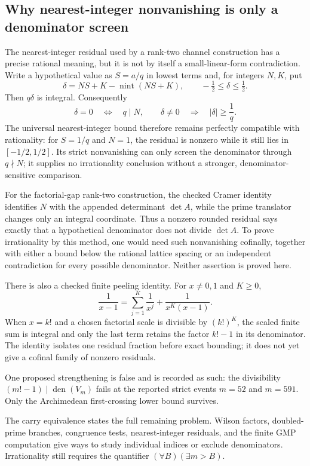 \documentclass[11pt]{article}
\newcommand{\Ser}{S}
\begin{document}
\subsection{Why nearest-integer nonvanishing is only a denominator screen}

The nearest-integer residual used by a rank-two channel construction has a
precise rational meaning, but it is not by itself a small-linear-form
contradiction.  Write a hypothetical value as $\Ser=a/q$ in lowest terms and,
for integers $N,K$, put
\[
  \delta= N\Ser+K-\operatorname{nint}(N\Ser+K),
  \qquad -\tfrac12\leq\delta\leq\tfrac12 .
\]
Then $q\delta$ is integral.  Consequently
\[
  \delta=0\quad\Longleftrightarrow\quad q\mid N,
  \qquad
  \delta\ne0\quad\Longrightarrow\quad |\delta|\geq\frac1q.
\]
The universal nearest-integer bound therefore remains perfectly compatible
with rationality: for $\Ser=1/q$ and $N=1$, the residual is nonzero while it
still lies in $[-1/2,1/2]$.  Its strict nonvanishing can only screen the
denominator through $q\nmid N$; it supplies no irrationality conclusion
without a stronger, denominator-sensitive comparison.

For the factorial-gap rank-two construction, the checked Cramer identity
identifies $N$ with the appended determinant $\det A$, while the prime
translator changes only an integral coordinate.  Thus a nonzero rounded
residual says exactly that a hypothetical denominator does not divide
$\det A$.  To prove irrationality by this method, one would need such
nonvanishing cofinally, together with either a bound below the rational lattice
spacing or an independent contradiction for every possible denominator.
Neither assertion is proved here.

There is also a checked finite peeling identity.  For $x\ne0,1$ and $K\ge0$,
\[
  \frac1{x-1}
  =\sum_{j=1}^{K}\frac1{x^j}
   +\frac1{x^K(x-1)}.
\]
When $x=k!$ and a chosen factorial scale is divisible by $(k!)^K$, the scaled
finite sum is integral and only the last term retains the factor $k!-1$ in
its denominator.  The identity isolates one residual fraction before exact
bounding; it does not yet give a cofinal family of nonzero residuals.

One proposed strengthening is false and is recorded as such: the divisibility
$(m!-1)\mid\operatorname{den}(V_m)$ fails at the reported strict events $m=52$
and $m=591$.  Only the Archimedean first-crossing lower bound survives.

The carry equivalence states the full remaining problem.  Wilson factors,
doubled-prime branches, congruence tests, nearest-integer residuals, and the
finite GMP computation give ways to study individual indices or exclude
denominators.  Irrationality still requires the quantifier
$(\forall B)(\exists m>B)$.
\end{document}
